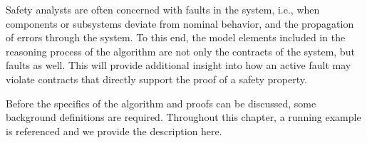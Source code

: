 Safety analysts are often concerned with faults in the system, i.e., when components or subsystems deviate from nominal behavior, and the propagation of errors through the system. To this end, the model elements included in the reasoning process of the \aivcalg algorithm are not only the contracts of the system, but faults as well. This will provide additional insight into how an active fault may violate contracts that directly support the proof of a safety property. 

Before the specifics of the algorithm and proofs can be discussed, some background definitions are required. Throughout this chapter, a running example is referenced and we provide the description here.









